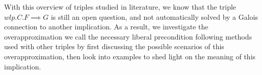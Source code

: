 With this overview of triples studied in literature, we know that the triple $wlp.C.F\implies G$ is still an open question, and not automatically solved by a Galois connection to another implication. 
As a result, we investigate the overapproximation we call the necessary liberal precondition following methods used with other triples by first discussing the possible scenarios of this overapproximation, then look into examples to shed light on the meaning of this implication. 



